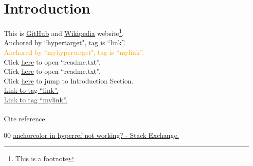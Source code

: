 \documentclass{article}
\newcommand{\myhypertarget}[3][orange]{\hypertarget{#2}{\textcolor{#1}{#3}}}
\begin{document}
	\tableofcontents
	\section{Introduction}
		\label{sec-introduction}
		This is \href{www.github.com}{GitHub} and \href{www.wikipedia.com}{Wikipedia} website\footnote{This is a footnote}.\\
		\hypertarget{link}{Anchored by ``hypertarget", tag is ``link''.}\\
		\myhypertarget{mylink}{Anchored by ``myhypertarget", tag is ``mylink''.} \\
		\noindent Click \href{readme.txt}{here} to open ``readme.txt''.\\
		\noindent Click \href{run:readme.txt}{here} to open ``readme.txt''.\\
		\noindent Click \hyperref[sec-introduction]{here} to jump to Introduction Section.\\
		\hyperlink{link}{Link to tag ``link''.}\\
		\hyperlink{mylink}{Link to tag ``mylink''.}\\
		\\
		Cite reference \cite{b1}
		\begin{thebibliography}{00}
		 \href{https://tex.stackexchange.com/questions/478463/anchorcolor-in-hyperref-not-working}{anchorcolor in hyperref not working? - Stack Exchange.}
		
		
\end{thebibliography}
\end{document}
